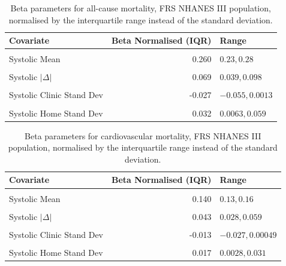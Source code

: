 \documentclass[
]{article}
\begin{document}
\begin{table}[!h]

\caption{\label{tab:iqrnormbeta}Beta parameters for all-cause mortality, FRS NHANES III population, normalised by the interquartile range instead of the standard deviation.}
\centering
\begin{tabular}[t]{lrl}
\toprule
Covariate & Beta Normalised (IQR) & Range\\
\midrule
\cellcolor{gray!6}{Diastolic Mean} & \cellcolor{gray!6}{-0.022} & \cellcolor{gray!6}{\(-0.05,0.0065\)}\\
Systolic Mean & 0.260 & \(0.23,0.28\)\\
\cellcolor{gray!6}{Diastolic $|\Delta|$} & \cellcolor{gray!6}{0.060} & \cellcolor{gray!6}{\(0.023,0.096\)}\\
Systolic $|\Delta|$ & 0.069 & \(0.039,0.098\)\\
\cellcolor{gray!6}{Diastolic Clinic Stand Dev} & \cellcolor{gray!6}{0.003} & \cellcolor{gray!6}{\(-0.037,0.043\)}\\
Systolic Clinic Stand Dev & -0.027 & \(-0.055,0.0013\)\\
\cellcolor{gray!6}{Diastolic Home Stand Dev} & \cellcolor{gray!6}{0.021} & \cellcolor{gray!6}{\(-0.01,0.052\)}\\
Systolic Home Stand Dev & 0.032 & \(0.0063,0.059\)\\
\bottomrule
\end{tabular}
\end{table}

\begin{table}[!h]

\caption{\label{tab:iqrnormbeta}Beta parameters for cardiovascular mortality, FRS NHANES III population, normalised by the interquartile range instead of the standard deviation.}
\centering
\begin{tabular}[t]{lrl}
\toprule
Covariate & Beta Normalised (IQR) & Range\\
\midrule
\cellcolor{gray!6}{Diastolic Mean} & \cellcolor{gray!6}{-0.019} & \cellcolor{gray!6}{\(-0.034,-0.0036\)}\\
Systolic Mean & 0.140 & \(0.13,0.16\)\\
\cellcolor{gray!6}{Diastolic $|\Delta|$} & \cellcolor{gray!6}{0.054} & \cellcolor{gray!6}{\(0.035,0.072\)}\\
Systolic $|\Delta|$ & 0.043 & \(0.028,0.059\)\\
\cellcolor{gray!6}{Diastolic Clinic Stand Dev} & \cellcolor{gray!6}{0.007} & \cellcolor{gray!6}{\(-0.012,0.026\)}\\
Systolic Clinic Stand Dev & -0.013 & \(-0.027,0.00049\)\\
\cellcolor{gray!6}{Diastolic Home Stand Dev} & \cellcolor{gray!6}{0.005} & \cellcolor{gray!6}{\(-0.011,0.021\)}\\
Systolic Home Stand Dev & 0.017 & \(0.0028,0.031\)\\
\bottomrule
\end{tabular}
\end{table}
\end{document}
